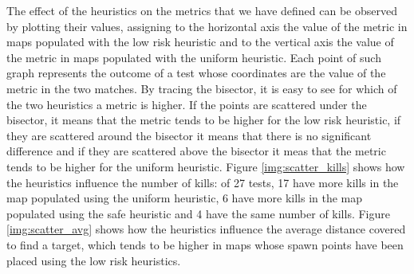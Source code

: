 The effect of the heuristics on the metrics that we have defined can be observed by plotting their values, assigning to the horizontal axis the value of the metric in maps populated with the low risk heuristic and to the vertical axis the value of the metric in maps populated with the uniform heuristic. Each point of such graph represents the outcome of a test whose coordinates are the value of the metric in the two matches. By tracing the bisector, it is easy to see for which of the two heuristics a metric is higher. If the points are scattered under the bisector, it means that the metric tends to be higher for the low risk heuristic, if they are scattered around the bisector it means that there is no significant difference and if they are scattered above the bisector it meas that the metric tends to be higher for the uniform heuristic. Figure \ref{img:scatter_kills} shows how the heuristics influence the number of kills: of 27 tests, 17 have more kills in the map  populated using the uniform heuristic, 6 have more kills in the map populated using the safe heuristic and 4 have the same number of kills. Figure \ref{img:scatter_avg} shows how the heuristics influence the average distance covered to find a target, which tends to be higher in maps whose spawn points have been placed using the low risk heuristics.

\par

